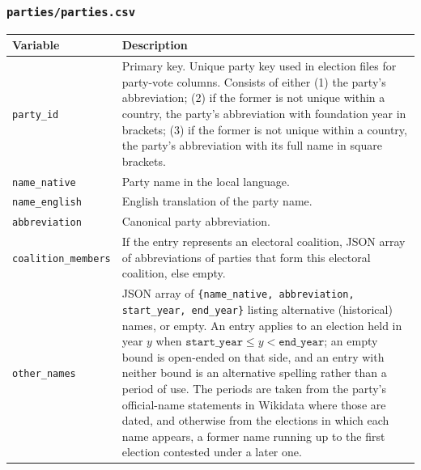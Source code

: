 \subsubsection{\texttt{parties/parties.csv}}

\begin{longtable}{p{4.5cm}p{10.5cm}}
\toprule
\textbf{Variable} & \textbf{Description} \\
\midrule
\endhead
\texttt{party\_id}          & Primary key. Unique party key used in election files for
                               party-vote columns. Consists of either (1) the party's abbreviation;
                               (2) if the former is not unique within a country, the party's abbreviation
                               with foundation year in brackets;
                               (3) if the former is not unique within a country, the party's abbreviation with its full
                               name in square brackets. \\
\texttt{name\_native}       & Party name in the local language. \\
\texttt{name\_english}      & English translation of the party name. \\
\texttt{abbreviation}       & Canonical party abbreviation. \\
\texttt{coalition\_members} & If the entry represents an electoral coalition, JSON array of abbreviations of parties that
                               form this electoral coalition, else empty. \\
\texttt{other\_names}       & JSON array of \texttt{\{name\_native, abbreviation,
                              start\_year, end\_year\}} listing alternative
                              (historical) names, or empty.  An entry applies to
                              an election held in year $y$ when
                              $\texttt{start\_year} \le y < \texttt{end\_year}$;
                              an empty bound is open-ended on that side, and an
                              entry with neither bound is an alternative
                              spelling rather than a period of use.  The periods
                              are taken from the party's official-name
                              statements in Wikidata where those are dated, and
                              otherwise from the elections in which each name
                              appears, a former name running up to the first
                              election contested under a later one. \\

\end{longtable}
